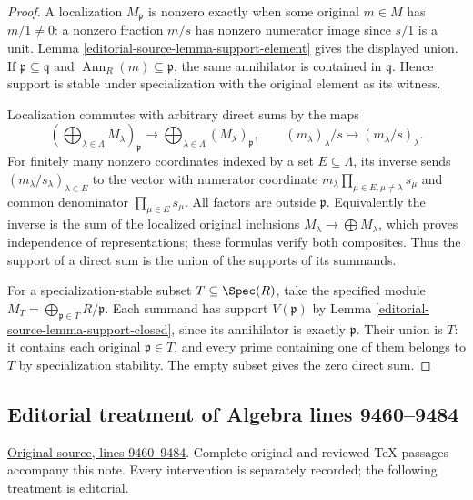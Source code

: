 \begin{proof}
A localization $M_{\mathfrak p}$ is nonzero exactly when
some original $m\in M$ has $m/1\ne0$: a nonzero fraction
$m/s$ has nonzero numerator image since $s/1$ is a unit.
Lemma \ref{editorial-source-lemma-support-element} gives the displayed union.
If $\mathfrak p\subseteq\mathfrak q$ and
$\operatorname{Ann}_R(m)\subseteq\mathfrak p$, the same
annihilator is contained in $\mathfrak q$. Hence support
is stable under specialization with the original element
as its witness.

Localization commutes with arbitrary direct sums by the
maps
$$
(\bigoplus_{\lambda\in\Lambda}M_\lambda)_{\mathfrak p}
\longrightarrow\bigoplus_{\lambda\in\Lambda}(M_\lambda)_{\mathfrak p},
\qquad (m_\lambda)_\lambda/s\longmapsto(m_\lambda/s)_\lambda.
$$
For finitely many nonzero coordinates indexed by a set
$E\subseteq\Lambda$, its inverse sends
$(m_\lambda/s_\lambda)_{\lambda\in E}$ to the vector
with numerator coordinate
$m_\lambda\prod_{\mu\in E,\mu\ne\lambda}s_\mu$
and common denominator $\prod_{\mu\in E}s_\mu$.
All factors are outside $\mathfrak p$.
Equivalently the inverse is the sum of the localized
original inclusions $M_\lambda\to\bigoplus M_\lambda$,
which proves independence of representations; these
formulas verify both composites. Thus the support of
a direct sum is the union of the supports of its summands.

For a specialization-stable subset $T\subseteq\Spec(R)$,
take the specified module
$M_T=\bigoplus_{\mathfrak p\in T}R/\mathfrak p$.
Each summand has support $V(\mathfrak p)$ by
Lemma \ref{editorial-source-lemma-support-closed}, since its annihilator
is exactly $\mathfrak p$. Their union is $T$: it contains
each original $\mathfrak p\in T$, and every prime
containing one of them belongs to $T$ by specialization
stability. The empty subset gives the zero direct sum.
\end{proof}


\subsection{Editorial treatment of Algebra lines 9460--9484}

\hypertarget{algebra-context-103}{}

\noindent\href{https://github.com/stacks/stacks-project/blob/a04446e57ec1fbc252a871afcec7752fb2807b14/algebra.tex\#L9460}{Original source, lines 9460--9484}. Complete original and reviewed TeX passages accompany this note. Every intervention is separately recorded; the following treatment is editorial.


